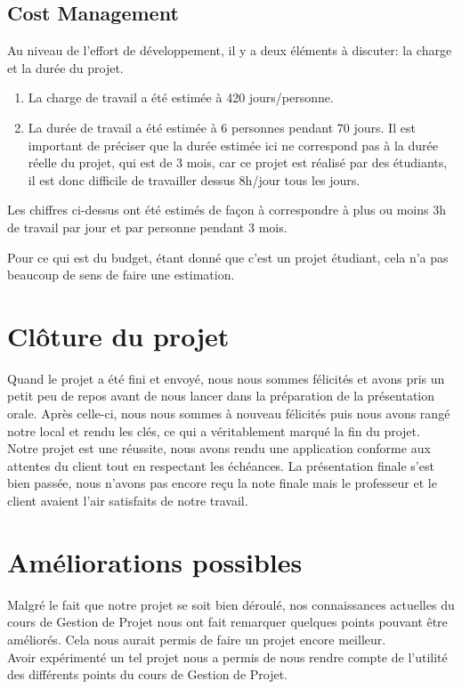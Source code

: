\documentclass[t, 12pt, usenames,dvipsnames]{article}
\begin{document}
        \subsection{Cost Management}
        \label{section:cost_mgmt}
            \noindent Au niveau de l'effort de développement, il y a deux éléments à discuter: la charge et la durée du projet.
            \begin{enumerate}
                \item La charge de travail a été estimée à 420 jours/personne.
                \item La durée de travail a été estimée à 6 personnes pendant 70 jours. Il est important de préciser que la durée estimée ici ne correspond pas à la durée réelle du projet, qui est de 3 mois, car ce projet est réalisé par des étudiants, il est donc difficile de travailler dessus 8h/jour tous les jours.
            \end{enumerate}
            Les chiffres ci-dessus ont été estimés de façon à correspondre à plus ou moins 3h de travail par jour et par personne pendant 3 mois.
            
            \noindent Pour ce qui est du budget, étant donné que c'est un projet étudiant, cela n'a pas beaucoup de sens de faire une estimation.
    
    \section{Clôture du projet}
        \noindent Quand le projet a été fini et envoyé, nous nous sommes félicités et avons pris un petit peu de repos avant de nous lancer dans la préparation de la présentation orale. Après celle-ci, nous nous sommes à nouveau félicités puis nous avons rangé notre local et rendu les clés, ce qui a véritablement marqué la fin du projet.\\
        Notre projet est une réussite, nous avons rendu une application conforme aux attentes du client tout en respectant les échéances. La présentation finale s'est bien passée, nous n'avons pas encore reçu la note finale mais le professeur et le client avaient l'air satisfaits de notre travail.\\
        
    \newpage
    
     \section{Améliorations possibles}
     \noindent Malgré le fait que notre projet se soit bien déroulé, nos connaissances actuelles du cours de Gestion de Projet nous ont fait remarquer quelques points pouvant être améliorés. Cela nous aurait permis de faire un projet encore meilleur. \\
     Avoir expérimenté un tel projet nous a permis de nous rendre compte de l'utilité des différents points du cours de Gestion de Projet.
     
\end{document}
